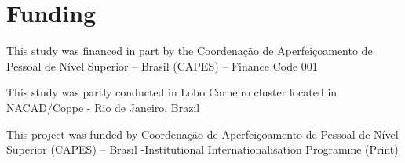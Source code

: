 \chapter*{Funding}
This study was financed in part by the Coordenação de Aperfeiçoamento de Pessoal de Nível Superior – Brasil (CAPES) – Finance Code 001

This study was partly conducted in Lobo Carneiro cluster located in NACAD/Coppe - Rio de Janeiro, Brazil

This project was funded by Coordenação de Aperfeiçoamento de Pessoal de Nível Superior (CAPES) – Brasil -Institutional Internationalisation Programme  (Print)
